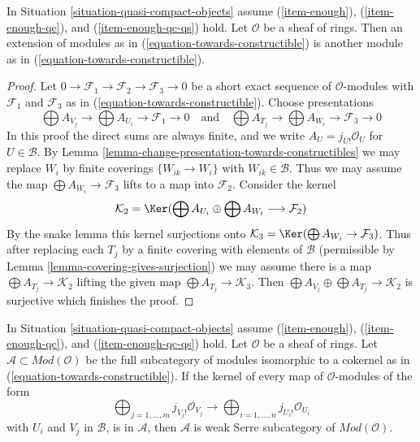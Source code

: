 \begin{lemma}
\label{lemma-extension-towards-constructibles}
In Situation \ref{situation-quasi-compact-objects} assume
(\ref{item-enough}), (\ref{item-enough-qc}), and (\ref{item-enough-qc-qs})
hold. Let $\mathcal{O}$ be a sheaf of rings.
Then an extension of modules as in (\ref{equation-towards-constructible})
is another module as in (\ref{equation-towards-constructible}).
\end{lemma}

\begin{proof}
Let $0 \to \mathcal{F}_1 \to \mathcal{F}_2 \to \mathcal{F}_3 \to 0$
be a short exact sequence of $\mathcal{O}$-modules with
$\mathcal{F}_1$ and $\mathcal{F}_3$ as in
(\ref{equation-towards-constructible}). Choose presentations
$$
\bigoplus A_{V_j} \to \bigoplus A_{U_i} \to \mathcal{F}_1 \to 0
\quad\text{and}\quad
\bigoplus A_{T_j} \to \bigoplus A_{W_i} \to \mathcal{F}_3 \to 0
$$
In this proof the direct sums are always finite, and
we write $A_U = j_{U!}\mathcal{O}_U$ for $U \in \mathcal{B}$.
By Lemma \ref{lemma-change-presentation-towards-constructibles}
we may replace $W_i$ by finite coverings $\{W_{ik} \to W_i\}$
with $W_{ik} \in \mathcal{B}$. Thus we may assume the map
$\bigoplus A_{W_i} \to \mathcal{F}_3$ lifts to a map into $\mathcal{F}_2$.
Consider the kernel
$$
\mathcal{K}_2 = \Ker(\bigoplus A_{U_i} \oplus \bigoplus A_{W_i}
\longrightarrow \mathcal{F}_2)
$$
By the snake lemma this kernel surjections onto
$\mathcal{K}_3 = \Ker(\bigoplus A_{W_i} \to \mathcal{F}_3)$.
Thus after replacing each $T_j$ by a finite covering with
elements of $\mathcal{B}$ (permissible by
Lemma \ref{lemma-covering-gives-surjection})
we may assume there is a map
$\bigoplus A_{T_j} \to \mathcal{K}_2$ lifting the given map
$\bigoplus A_{T_j} \to \mathcal{K}_3$.
Then $\bigoplus A_{V_j} \oplus \bigoplus A_{T_j} \to \mathcal{K}_2$
is surjective which finishes the proof.
\end{proof}

\begin{lemma}
\label{lemma-towards-constructible-when-serre-subcategory}
In Situation \ref{situation-quasi-compact-objects} assume
(\ref{item-enough}), (\ref{item-enough-qc}), and (\ref{item-enough-qc-qs})
hold. Let $\mathcal{O}$ be a sheaf of rings.
Let $\mathcal{A} \subset \textit{Mod}(\mathcal{O})$ be the full
subcategory of modules isomorphic to a cokernel as in
(\ref{equation-towards-constructible}).
If the kernel of every map of $\mathcal{O}$-modules of the form
$$
\bigoplus\nolimits_{j = 1, \ldots, m} j_{V_j!}\mathcal{O}_{V_j}
\longrightarrow
\bigoplus\nolimits_{i = 1, \ldots, n} j_{U_i!}\mathcal{O}_{U_i}
$$
with $U_i$ and $V_j$ in $\mathcal{B}$, is in $\mathcal{A}$, then
$\mathcal{A}$ is weak Serre subcategory of $\textit{Mod}(\mathcal{O})$.
\end{lemma}

